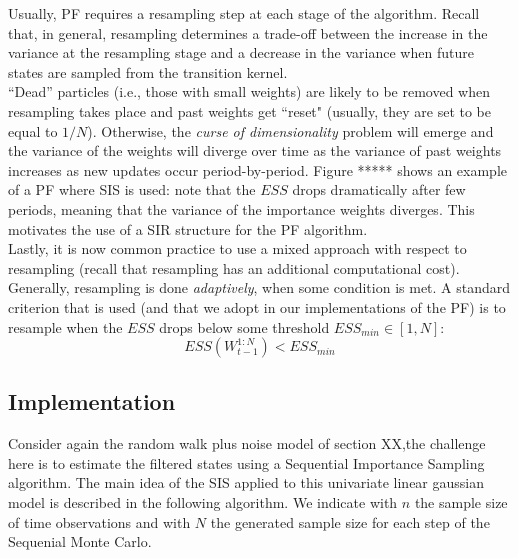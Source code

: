 \documentclass[
]{book}
\theoremstyle{break}
\theoremstyle{nonumberplain}
\begin{document}
Usually, PF requires a resampling step at each stage of the algorithm.
Recall that, in general, resampling determines a trade-off between the
increase in the variance at the resampling stage and a decrease in the
variance when future states are sampled from the transition kernel.\\
``Dead'' particles (i.e., those with small weights) are likely to be
removed when resampling takes place and past weights get ``reset"
(usually, they are set to be equal to \(1/N\)). Otherwise, the
\textit{curse of dimensionality} problem will emerge and the variance of
the weights will diverge over time as the variance of past weights
increases as new updates occur period-by-period. Figure ***** shows an
example of a PF where SIS is used: note that the \(ESS\) drops
dramatically after few periods, meaning that the variance of the
importance weights diverges. This motivates the use of a SIR structure
for the PF algorithm.~\\
Lastly, it is now common practice to use a mixed approach with respect
to resampling (recall that resampling has an additional computational
cost). Generally, resampling is done \textit{adaptively}, when some
condition is met. A standard criterion that is used (and that we adopt
in our implementations of the PF) is to resample when the \(ESS\) drops
below some threshold \(ESS_{min}\in [1,N]\): \begin{equation}
    ESS(W_{t-1}^{1:N})<ESS_{min}
\end{equation}

\subsection{Implementation}

Consider again the random walk plus noise model of section XX,the
challenge here is to estimate the filtered states using a Sequential
Importance Sampling algorithm. The main idea of the SIS applied to this
univariate linear gaussian model is described in the following
algorithm. We indicate with \(n\) the sample size of time observations
and with \(N\) the generated sample size for each step of the Sequenial
Monte Carlo.
\end{document}

